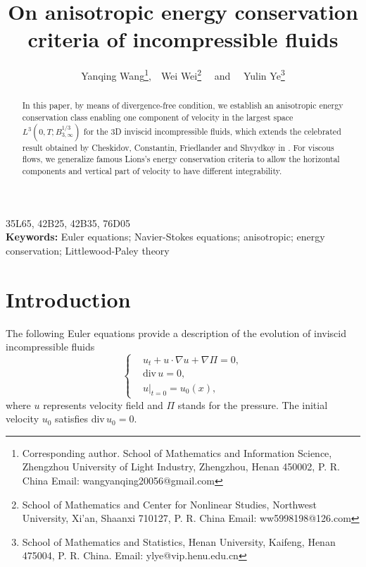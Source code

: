 \documentclass[11pt]{article}
\theoremstyle{plain}\newtheorem{definition}{Definition}[section]
\theoremstyle{definition}\newtheorem{theorem}{Theorem}[section]
\theoremstyle{plain}\newtheorem{lemma}[theorem]{Lemma}
\theoremstyle{plain}\newtheorem{coro}[theorem]{Corollary}
\theoremstyle{plain}\newtheorem{prop}[theorem]{Proposition}
\theoremstyle{remark}\newtheorem{remark}{Remark}[section]
\numberwithin{equation}{section}
\begin{document}
 \title{On anisotropic energy conservation criteria   of  incompressible fluids}
 \author{Yanqing Wang\footnote{Corresponding author. School of Mathematics and   Information Science, Zhengzhou University of Light Industry, Zhengzhou, Henan  450002,  P. R. China Email: wangyanqing20056@gmail.com},\;~~Wei Wei\footnote{ School of Mathematics and Center for Nonlinear Studies,  Northwest University, Xi'an, Shaanxi 710127,  P. R. China  Email: ww5998198@126.com }
  \;~~and ~~Yulin Ye\footnote{School of Mathematics and Statistics, Henan University, Kaifeng, Henan  475004, P. R. China. Email: ylye@vip.henu.edu.cn }
   }
\date{}
\maketitle
\begin{abstract}
 In this paper, by means of divergence-free condition, we establish
an anisotropic energy conservation class enabling one component of velocity in the largest space $L^{3} (0,T; B^{1/3}_{3,\infty})$ for the 3D inviscid incompressible fluids, which extends the celebrated result obtained by  Cheskidov,    Constantin,   Friedlander and   Shvydkoy in \cite[Nonlinearity 21 (2008)]{[CCFS]}. For   viscous flows, we generalize famous Lions's energy conservation criteria to allow   the
horizontal components and vertical part of velocity to have different integrability.%



 \end{abstract}
\quad 35L65, 42B25, 42B35, 76D05 \\\noindent
 {\bf Keywords:} Euler equations; Navier-Stokes equations; anisotropic; energy conservation; Littlewood-Paley theory \\
\section{Introduction}
\label{intro}
\setcounter{section}{1}\setcounter{equation}{0}
The following Euler equations provide a description of
the evolution of  inviscid incompressible fluids
\begin{equation}\left\{\begin{aligned}\label{Euler}
&u_{t}+u\cdot \nabla u+\nabla \Pi=0,\\ &\text{div}\, u=0,\\
&u|_{t=0}=u_{0}(x),
\end{aligned}\right.\end{equation}
where $u$ represents velocity field and $\Pi$ stands for the pressure.
 The
initial  velocity $u_0$ satisfies   $\text{div}\,u_0=0$.
\end{document}
